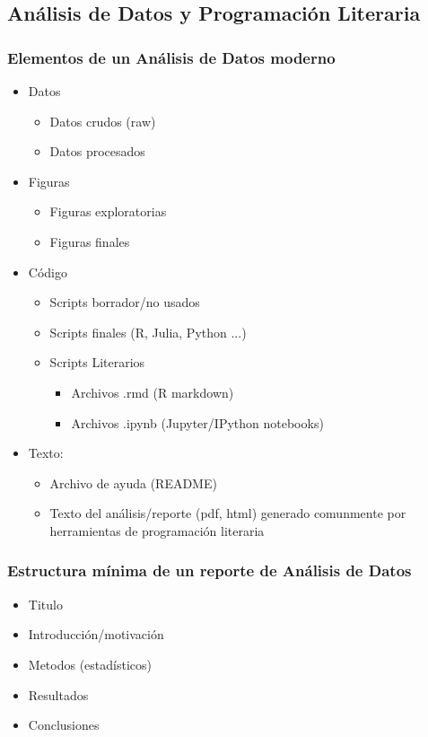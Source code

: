 \documentclass[sans serif,9pt,xcolor=dvipsnames]{beamer}%
\begin{document}
\subsection{Análisis de Datos y Programación Literaria}
\begin{frame}
\frametitle{Elementos de un Análisis de Datos moderno }
\justifying
\begin{block}{}
\begin{itemize}
\item Datos
  \begin{itemize}
  \item Datos crudos (raw)
  \item Datos procesados
  \end{itemize}
\item Figuras
\begin{itemize}
  \item Figuras exploratorias
  \item Figuras finales
\end{itemize}
\item Código
\begin{itemize}
  \item Scripts borrador/no usados
  \item Scripts finales (R, Julia, Python ...)
  \item Scripts Literarios 
\begin{itemize}
    \item Archivos .rmd (R markdown)
    \item Archivos .ipynb (Jupyter/IPython notebooks)
\end{itemize}    
\end{itemize}
\item Texto:
\begin{itemize}
  \item Archivo de ayuda (README)
  \item Texto del análisis/reporte (pdf, html) generado comunmente por  herramientas de programación literaria
 \end{itemize}
\end{itemize}
\end{block}
\end{frame}

\begin{frame}
\frametitle{Estructura mínima de un reporte de Análisis de Datos}
\justifying
\begin{block}{}
\begin{itemize}
\item \Large Titulo
\item \Large Introducción/motivación
\item \Large Metodos (estadísticos)
\item \Large Resultados
\item \Large Conclusiones
\end{itemize}
\end{block}
\end{frame}
\end{document}
